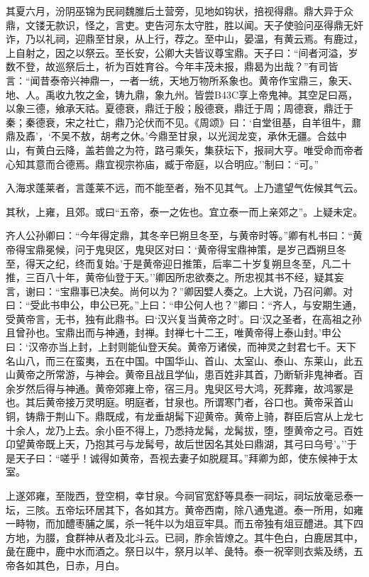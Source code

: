 \documentclass[]{article}
\begin{document}
其夏六月，汾阴巫锦为民祠魏脽后土营旁，见地如钩状，掊视得鼎。鼎大异于众鼎，文镂无款识，怪之，言吏。吏告河东太守胜，胜以闻。天子使验问巫得鼎无奸诈，乃以礼祠，迎鼎至甘泉，从上行，荐之。至中山，晏温，有黄云焉。有鹿过，上自射之，因之以祭云。至长安，公卿大夫皆议尊宝鼎。天子曰：``间者河溢，岁数不登，故巡祭后土，祈为百姓育谷。今年丰茂未报，鼎曷为出哉？''有司皆言：``闻昔泰帝兴神鼎一，一者一统，天地万物所系象也。黄帝作宝鼎三，象天、地、人。禹收九牧之金，铸九鼎，象九州。皆尝B43C享上帝鬼神。其空足曰鬲，以象三德，飨承天祜。夏德衰，鼎迁于殷；殷德衰，鼎迁于周；周德衰，鼎迁于秦；秦德衰，宋之社亡，鼎乃沦伏而不见。《周颂》曰：`自堂徂基，自羊徂牛，鼐鼎及鼒'，`不吴不敖，胡考之休。'今鼎至甘泉，以光润龙变，承休无疆。合兹中山，有黄白云降，盖若兽之为符，路弓乘矢，集获坛下，报祠大亨。唯受命而帝者心知其意而合德焉。鼎宜视宗祢庙，臧于帝庭，以合明应。''制曰：``可。''

入海求蓬莱者，言蓬莱不远，而不能至者，殆不见其气。上乃遣望气佐候其气云。

其秋，上雍，且郊。或曰``五帝，泰一之佐也。宜立泰一而上亲郊之''。上疑未定。

齐人公孙卿曰：``今年得定鼎，其冬辛巳朔旦冬至，与黄帝时等。''卿有札书曰：``黄帝得宝鼎冕候，问于鬼臾区，鬼臾区对曰：`黄帝得宝鼎神策，是岁己酉朔旦冬至，得天之纪，终而复始。'于是黄帝迎日推策，后率二十岁复朔旦冬至，凡二十推，三百八十年，黄帝仙登于天。''卿因所忠欲奏之。所忠视其书不经，疑其妄言，谢曰：``宝鼎事已决矣。尚何以为？''卿因嬖人奏之。上大说，乃召问卿。对曰：``受此书申公，申公已死。''上曰：``申公何人也？''卿曰：``齐人，与安期生通，受黄帝言，无书，独有此鼎书。曰`汉兴复当黄帝之时'。曰`汉之圣者，在高祖之孙且曾孙也。宝鼎出而与神通，封禅。封禅七十二王，唯黄帝得上泰山封。'申公曰：`汉帝亦当上封，上封则能仙登天矣。黄帝万诸侯，而神灵之封君七千。天下名山八，而三在蛮夷，五在中国。中国华山、首山、太室山、泰山、东莱山，此五山黄帝之所常游，与神会。黄帝且战且学仙，患百姓非其首，乃断斩非鬼神者。百余岁然后得与神通。黄帝郊雍上帝，宿三月。鬼臾区号大鸿，死葬雍，故鸿冢是也。其后黄帝接万灵明庭。明庭者，甘泉也。所谓寒门者，谷口也。黄帝采首山铜，铸鼎于荆山下。鼎既成，有龙垂胡髯下迎黄帝。黄帝上骑，群臣后宫从上龙七十余人，龙乃上去。余小臣不得上，乃悉持龙髯，龙髯拔，堕，堕黄帝之弓。百姓卬望黄帝既上天，乃抱其弓与龙髯号，故后世因名其处曰鼎湖，其弓曰乌号'。''于是天子曰：``嗟乎！诚得如黄帝，吾视去妻子如脱屣耳。''拜卿为郎，使东候神于太室。

上遂郊雍，至陇西，登空桐，幸甘泉。今祠官宽舒等具泰一祠坛，祠坛放毫忌泰一坛，三陔。五帝坛环居其下，各如其方。黄帝西南，除八通鬼道。泰一所用，如雍一畤物，而加醴枣脯之属，杀一牦牛以为俎豆牢具。而五帝独有俎豆醴进。其下四方地，为腏，食群神从者及北斗云。已祠，胙余皆燎之。其牛色白，白鹿居其中，彘在鹿中，鹿中水而酒之。祭日以牛，祭月以羊、彘特。泰一祝宰则衣紫及绣，五帝各如其色，日赤，月白。
\end{document}

